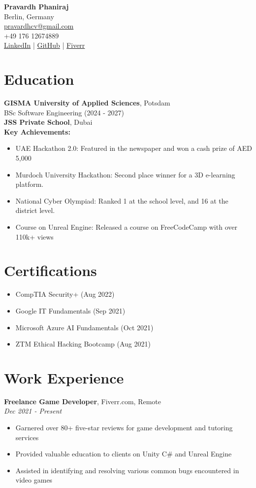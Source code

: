 \documentclass[a4paper,10pt]{article}
\begin{document}
\begin{center}
    {\LARGE \textbf{Pravardh Phaniraj}} \\
    Berlin, Germany \\
    \href{mailto:pravardhcv@gmail.com}{pravardhcv@gmail.com} \\
    +49 176 12674889 \\
    \href{http://www.linkedin.com/in/pravardh}{LinkedIn} |
    \href{http://www.github.com/Pravardh}{GitHub} |
    \href{http://fiverr.com/pravardhcv}{Fiverr}
\end{center}

\section*{Education}
\textbf{GISMA University of Applied Sciences}, Potsdam \\
BSc Software Engineering (2024 - 2027) \\

\textbf{JSS Private School}, Dubai \\

\textbf{Key Achievements:}
\begin{itemize}
    \item UAE Hackathon 2.0: Featured in the newspaper and won a cash prize of AED 5,000
    \item Murdoch University Hackathon: Second place winner for a 3D e-learning platform.
    \item National Cyber Olympiad: Ranked 1 at the school level, and 16 at the district level.
    \item Course on Unreal Engine: Released a course on FreeCodeCamp with over 110k+ views
\end{itemize}

\section*{Certifications}
\begin{itemize}
    \item CompTIA Security+ (Aug 2022)
    \item Google IT Fundamentals (Sep 2021)
    \item Microsoft Azure AI Fundamentals (Oct 2021)
    \item ZTM Ethical Hacking Bootcamp (Aug 2021)
\end{itemize}

\section*{Work Experience}
\textbf{Freelance Game Developer}, Fiverr.com, Remote \\
\textit{Dec 2021 - Present}
\begin{itemize}
    \item Garnered over 80+ five-star reviews for game development and tutoring services
    \item Provided valuable education to clients on Unity C\# and Unreal Engine
    \item Assisted in identifying and resolving various common bugs encountered in video games
\end{itemize}
\end{document}
